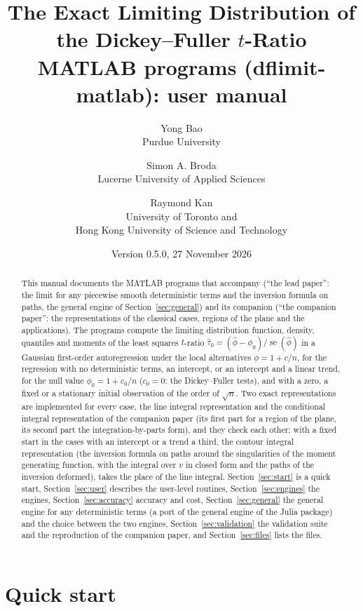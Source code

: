 \documentclass[11pt]{article}
\title{The Exact Limiting Distribution of the Dickey--Fuller $t$-Ratio\\[0.6ex]\large MATLAB programs (dflimit-matlab): user manual}
\author{Yong Bao\\\normalsize Purdue University \and Simon A. Broda\\\normalsize Lucerne University of Applied Sciences \and Raymond Kan\\\normalsize University of Toronto and\\\normalsize Hong Kong University of Science and Technology}
\date{Version 0.5.0, 27 November 2026}
\newcommand{\phih}{\hat\phi}
\newcommand{\tauh}{\hat\tau}
\begin{document}
\maketitle

\begin{abstract}
\noindent This manual documents the MATLAB programs that accompany \citet*{BaoBrodaKan2026main} (``the lead paper'': the limit for any piecewise smooth deterministic terms and the inversion formula on paths, the general engine of Section~\ref{sec:general}) and its companion \citet*{BaoBrodaKan2026l} (``the companion paper'': the representations of the classical cases, regions of the plane and the applications).  The programs compute the limiting distribution function, density, quantiles and moments of the least squares $t$-ratio $\tauh_0=(\phih-\phi_0)/\operatorname{se}(\phih)$ in a Gaussian first-order autoregression under the local alternatives $\phi=1+c/n$, for the regression with no deterministic terms, an intercept, or an intercept and a linear trend, for the null value $\phi_0=1+c_0/n$ ($c_0=0$: the Dickey--Fuller tests), and with a zero, a fixed or a stationary initial observation of the order of $\sqrt n$.  Two exact representations are implemented for every case, the line integral representation and the conditional integral representation of the companion paper (its first part for a region of the plane, its second part the integration-by-parts form), and they check each other; with a fixed start in the cases with an intercept or a trend a third, the contour integral representation (the inversion formula on paths around the singularities of the moment generating function, with the integral over $v$ in closed form and the paths of the inversion deformed), takes the place of the line integral.  Section~\ref{sec:start} is a quick start, Section~\ref{sec:user} describes the user-level routines, Section~\ref{sec:engines} the engines, Section~\ref{sec:accuracy} accuracy and cost, Section~\ref{sec:general} the general engine for any deterministic terms (a port of the general engine of the Julia package) and the choice between the two engines, Section~\ref{sec:validation} the validation suite and the reproduction of the companion paper, and Section~\ref{sec:files} lists the files.
\end{abstract}

\tableofcontents

\section{Quick start}
\label{sec:start}
\end{document}
